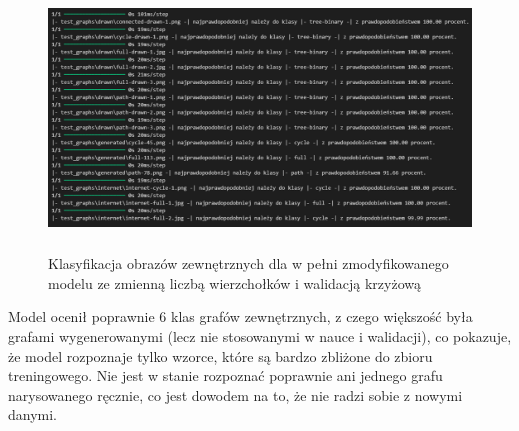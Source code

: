 \begin{figure}[ht]
	\centering
	\includegraphics[height=7cm]{resources/tests/images/v4/multiple_edges_crossvalid_txt.png}
	\caption{Klasyfikacja obrazów zewnętrznych dla w pełni zmodyfikowanego modelu ze zmienną liczbą wierzchołków i walidacją krzyżową}
	\label{Fig:tests-csvar-2b}
\end{figure}
\FloatBarrier

Model ocenił poprawnie 6 klas grafów zewnętrznych, z czego większość była grafami wygenerowanymi
(lecz nie stosowanymi w nauce i walidacji), co pokazuje, że model rozpoznaje tylko wzorce,
które są bardzo zbliżone do zbioru treningowego.
Nie jest w stanie rozpoznać poprawnie ani jednego grafu narysowanego ręcznie,
co jest dowodem na to, że nie radzi sobie z nowymi danymi.
